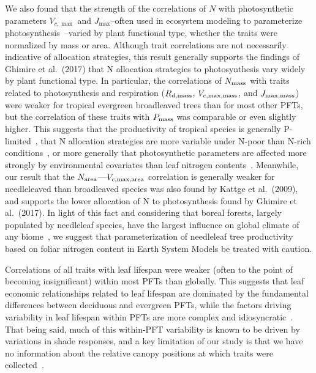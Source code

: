 We also found that the strength of the correlations of $N$ with photosynthetic parameters $V_{c,\max}$ and $J_{\max}$--often used in ecosystem modeling to parameterize photosynthesis~\cite{clm45_note,rogers_roadmap_2017}--varied by plant functional type, whether the traits were normalized by mass or area.
Although trait correlations are not necessarily indicative of allocation strategies, this result generally supports the findings of Ghimire et al.~(2017) \nocite{ghimire_2017_Nallocation} that N allocation strategies to photosynthesis vary widely by plant functional type.
In particular, the correlations of $N_{\text{mass}}$ with traits related to photosynthesis and respiration ($R_{d,\text{mass}}$, $V_{c,\max,\text{mass}}$, and $J_{\max,\text{mass}}$) were weaker for tropical evergreen broadleaved trees than for most other PFTs, but the correlation of these traits with $P_{\text{mass}}$ was comparable or even slightly higher.
This suggests that the productivity of tropical species is generally P-limited~\cite{reich_global_2004,ghimire_2017_Nallocation}, that N allocation strategies are more variable under N-poor than N-rich conditions~\cite{ghimire_2017_Nallocation}, or more generally that photosynthetic parameters are affected more strongly by environmental covariates than leaf nitrogen contents~\cite{Ali_2015}.
Meanwhile, our result that the $N_{\text{area}}$---$V_{c,\max,\text{area}}$ correlation is generally weaker for needleleaved than broadleaved species was also found by Kattge et al.~(2009), and supports the lower allocation of N to photosynthesis found by Ghimire et al.~(2017). \nocite{ghimire_2017_Nallocation,kattge_2009_vcmax}
In light of this fact and considering that boreal forests, largely populated by needleleaf species, have the largest influence on global climate of any biome~\cite{Snyder_2004,bonan_forests_2008}, we suggest that parameterization of needleleaf tree productivity based on foliar nitrogen content in Earth System Models be treated with caution.

Correlations of all traits with leaf lifespan were weaker (often to the point of becoming insignificant) within most PFTs than globally.
This suggests that leaf economic relationships related to leaf lifespan are dominated by the fundamental differences between deciduous and evergreen PFTs, while the factors driving variability in leaf lifespan within PFTs are more complex and idiosyncratic~\cite{Reich_2014,wu_leaf_2016}.
That being said, much of this within-PFT variability is known to be driven by variations in shade responses, and a key limitation of our study is that we have no information about the relative canopy positions at which traits were collected~\cite{lusk_why_2008,keenan_global_2016}.

